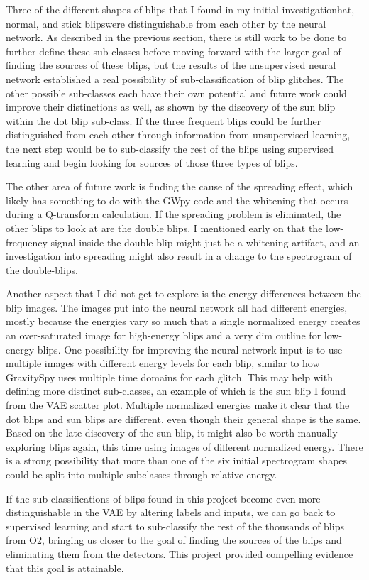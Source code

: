 \documentclass[a4paper]{article}
\begin{document}
Three of the different shapes of blips that I found in my initial investigation\textemdash hat, normal, and stick blips\textemdash were distinguishable from each other by the neural network. As described in the previous section, there is still work to be done to further define these sub-classes before moving forward with the larger goal of finding the sources of these blips, but the results of the unsupervised neural network established a real possibility of sub-classification of blip glitches. The other possible sub-classes each have their own potential and future work could improve their distinctions as well, as shown by the discovery of the sun blip within the dot blip sub-class. If the three frequent blips could be further distinguished from each other through information from unsupervised learning, the next step would be to sub-classify the rest of the blips using supervised learning and begin looking for sources of those three types of blips. 

The other area of future work is finding the cause of the spreading effect, which likely has something to do with the GWpy code and the whitening that occurs during a Q-transform calculation. If the spreading problem is eliminated, the other blips to look at are the double blips. I mentioned early on that the low-frequency signal inside the double blip might just be a whitening artifact, and an investigation into spreading might also result in a change to the spectrogram of the double-blips.

Another aspect that I did not get to explore is the energy differences between the blip images. The images put into the neural network all had different energies, mostly because the energies vary so much that a single normalized energy creates an over-saturated image for high-energy blips and a very dim outline for low-energy blips. One possibility for improving the neural network input is to use multiple images with different energy levels for each blip, similar to how GravitySpy uses multiple time domains for each glitch. This may help with defining more distinct sub-classes, an example of which is the sun blip I found from the VAE scatter plot. Multiple normalized energies make it clear that the dot blips and sun blips are different, even though their general shape is the same. Based on the late discovery of the sun blip, it might also be worth manually exploring blips again, this time using images of different normalized energy. There is a strong possibility that more than one of the six initial spectrogram shapes could be split into multiple subclasses through relative energy. 

If the sub-classifications of blips found in this project become even more distinguishable in the VAE by altering labels and inputs, we can go back to supervised learning and start to sub-classify the rest of the thousands of blips from O2, bringing us closer to the goal of finding the sources of the blips and eliminating them from the detectors. This project provided compelling evidence that this goal is attainable. 



\end{document}
